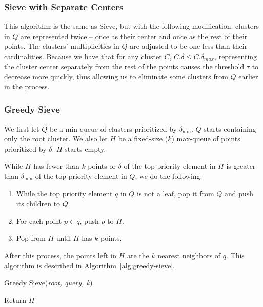 \subsubsection{Sieve with Separate Centers}
\label{subsubsec:methods:knn-search:sieve2}

This algorithm is the same as Sieve, but with the following modification:
clusters in $Q$ are represented twice -- once as their center and once as the rest of their points.
The clusters' multiplicities in $Q$ are adjusted to be one less than their cardinalities.
Because we have that for any cluster $C$, $C.\delta \leq C.\delta_{max}$, representing the cluster center separately from the rest of the points causes the threshold $\tau$ to decrease more quickly, thus allowing us to eliminate some clusters from $Q$ earlier in the process. 


\subsubsection{Greedy Sieve}
\label{subsubsec:methods:knn-search:greedy-search}

We first let $Q$ be a min-queue of clusters prioritized by $\delta_{\min}$.
$Q$ starts containing only the root cluster.
We also let $H$ be a fixed-size ($k$) max-queue of points prioritized by $\delta$.
$H$ starts empty.

While $H$ has fewer than $k$ points or $\delta$ of the top priority element in $H$ is greater than $\delta_{\min}$ of the top priority element in $Q$, we do the following:

\begin{enumerate}
\item While the top priority element $q$ in $Q$ is not a leaf, pop it from $Q$ and push its children to $Q$.
\item For each point $p \in q$, push $p$ to $H$. 
\item Pop from $H$ until $H$ has $k$ points. 
\end{enumerate}

After this process, the points left in $H$ are the $k$ nearest neighbors of $q$.
This algorithm is described in Algorithm~\ref{alg:greedy-sieve}.

\begin{algorithm} 
\caption{Greedy Sieve(\emph{root, query, k})} 
\label{alg:greedy-sieve} 
\begin{algorithmic}
        \ENDWHILE
        \ENDWHILE
    \ENDWHILE
    \STATE Return $H$
\end{algorithmic}
\end{algorithm}


